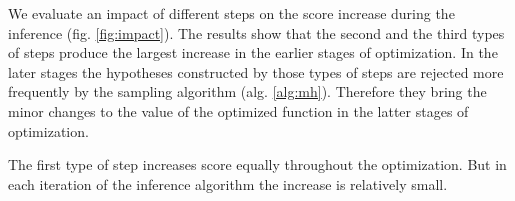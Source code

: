 We evaluate an impact of different steps on the score increase during the inference (fig. \ref{fig:impact}). The results show that the second and the third types of steps produce the largest increase in the earlier stages of optimization. In the later stages the hypotheses constructed by those types of steps are rejected more frequently by the sampling algorithm (alg. \ref{alg:mh}). Therefore they bring the minor changes to the value of the optimized function in the latter stages of optimization. 

The first type of step increases score equally throughout the optimization. But in each iteration of the inference algorithm the increase is relatively small.

\fi